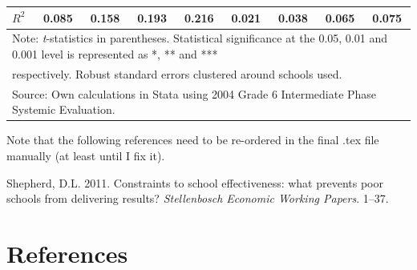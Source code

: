 \documentclass[12pt,preprint, authoryear]{article}
\numberwithin{equation}{section}
\numberwithin{figure}{section}
\numberwithin{table}{section}
\begin{document}
\begin{longtable}[htbp] {p{5cm}*{4}{c}|*{4}{c}}
\(R^{2}\)       &    0.085         &    0.158         &    0.193         &    0.216         &    0.021         &    0.038         &    0.065         &    0.075         \\
\hline\hline
\multicolumn{9}{l}{Note: \textit{t}-statistics in parentheses. Statistical significance at the 0.05, 0.01 and 0.001 level is represented as *, ** and ***} \\
\multicolumn{9}{l}{ respectively. Robust standard errors clustered around schools used.}\\
\multicolumn{9}{l}{Source: Own calculations in Stata using 2004 Grade 6 Intermediate Phase Systemic Evaluation.}\\
\end{longtable}

\normalsize

\newpage

Note that the following references need to be re-ordered in the final
.tex file manually (at least until I fix it).

\hypertarget{refs}{}
\hypertarget{ref-Shepherd2011}{}
Shepherd, D.L. 2011. Constraints to school effectiveness: what prevents
poor schools from delivering results? \emph{Stellenbosch Economic
Working Papers}. 1--37.

\newcommand\wordcount{
    \immediate\write18{texcount -sub=section \jobname.tex  | grep "Section" |     sed -e 's/+.*//' | sed -n \thesection p > 'count.txt'}
(words)}

\section*{References}
\end{document}
